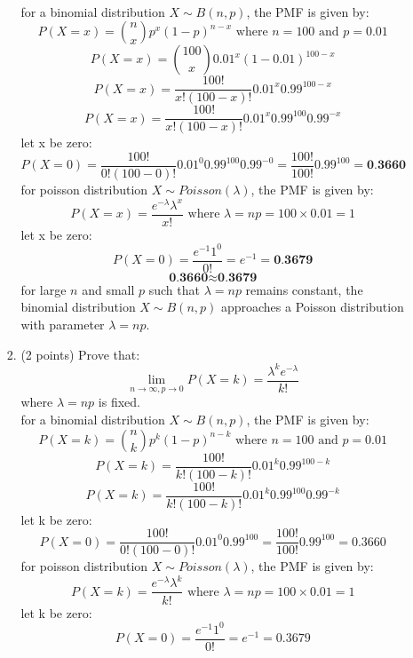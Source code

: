 \documentclass[a3paper,12pt]{article} %
\begin{document}
\begin{enumerate}
\begin{enumerate}
\begin{enumerate}
            \\ for a binomial distribution  \( X \sim B(n, p) \), the PMF is given by:
            \[
                P(X = x) = \binom{n}{x} p^x (1 - p)^{n - x} \text{ where } n = 100 \text{ and } p = 0.01
            \]
            \[
                P(X = x) = \binom{100}{x} 0.01^x (1 - 0.01)^{100 - x}
            \]
            \[
                P(X = x) = \frac{100!}{x!(100 - x)!} 0.01^x 0.99^{100 - x}
            \]
            \[
                P(X = x) = \frac{100!}{x!(100 - x)!} 0.01^x 0.99^{100} 0.99^{-x}
            \]
            let x be zero:
            \[
                P(X = 0) = \frac{100!}{0!(100 - 0)!} 0.01^0 0.99^{100} 0.99^{-0} = \frac{100!}{100!} 0.99^{100} = \textbf{0.3660}
            \]
            for poisson distribution  \( X \sim Poisson(\lambda) \), the PMF is given by:
            \[
                P(X = x) = \frac{e^{-\lambda} \lambda^x}{x!} \text{ where } \lambda = np = 100 \times 0.01 = 1
            \]
            let x be zero:
            \[
                P(X = 0) = \frac{e^{-1} 1^0}{0!} = e^{-1} = \textbf{0.3679}
            \]
            \[
                \textbf{0.3660} \approx \textbf{0.3679}
            \]
            for large \( n \) and small \( p \) such that \( \lambda = np \) remains constant, the binomial distribution \( X \sim B(n, p) \) approaches a Poisson distribution with parameter \( \lambda = np \).
            \item (2 points) Prove that:
            \[
                \lim_{n \to \infty, p \to 0} P(X = k) = \frac{\lambda^k e^{-\lambda}}{k!}
            \]
            where \(\lambda = np\) is fixed.
            \\ for a binomial distribution  \( X \sim B(n, p) \), the PMF is given by:
            \[
                P(X = k) = \binom{n}{k} p^k (1 - p)^{n - k} \text{ where } n = 100 \text{ and } p = 0.01
            \]
            \[
                P(X = k) = \frac{100!}{k!(100 - k)!} 0.01^k 0.99^{100 - k}
            \]
            \[
                P(X = k) = \frac{100!}{k!(100 - k)!} 0.01^k 0.99^{100} 0.99^{-k}
            \]
            let k be zero:
            \[
                P(X = 0) = \frac{100!}{0!(100 - 0)!} 0.01^0 0.99^{100} = \frac{100!}{100!} 0.99^{100} = 0.3660
            \]
            for poisson distribution  \( X \sim Poisson(\lambda) \), the PMF is given by:
            \[
                P(X = k) = \frac{e^{-\lambda} \lambda^k}{k!} \text{ where } \lambda = np = 100 \times 0.01 = 1
            \]
            let k be zero:
            \[
                P(X = 0) = \frac{e^{-1} 1^0}{0!} = e^{-1} = 0.3679
\]
\end{enumerate}
\end{enumerate}
\end{enumerate}
\end{document}
